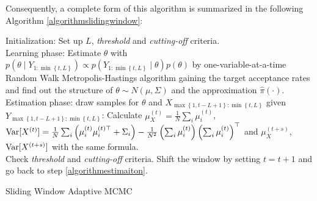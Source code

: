 Consequently, a complete form of this algorithm is summarized in the following Algorithm \ref{algorithmslidingwindow}: 
\begin{algorithm}[ht]
\SetAlgoLined 
Initialization: Set up $L$, \textit{threshold} and  \textit{cutting-off} criteria. \\
Learning phase: Estimate $\theta$ with $p\left(\theta\mid Y_{1:\min \left\lbrace t,L\right\rbrace } \right) \propto p\left(Y_{1:\min \left\lbrace t,L\right\rbrace } \mid \theta \right)p\left(\theta \right)$ by one-variable-at-a-time Random Walk Metropolis-Hastings algorithm gaining the target acceptance rates and find out the structure of $\theta\sim N\left(\mu,\Sigma\right)$ and the approximation $\hat{\pi}\left(\cdot\right)$. \label{algorithmlearningsurface}\\
Estimation phase: draw samples for $\theta$ and $X_{ \max\left\lbrace 1,t-L+1 \right\rbrace :\min \left\lbrace t,L\right\rbrace }$ given $Y_{ \max\left\lbrace 1,t-L+1 \right\rbrace :\min \left\lbrace t,L\right\rbrace }$: 
Calculate $\mu_X^{\left(t\right)} = \frac{1}{N} \sum_i \mu_i^{\left(t\right)}$, $\mathrm{Var}\lbrack X^{\left(t\right)}\rbrack = \frac{1}{N} \sum_i \left(\mu_i^{\left(t\right)} \mu_i^{\left(t\right)\top} +\Sigma_i\right) -\frac{1}{N^2} \left(\sum_i  \mu_i^{\left(t\right)}\right) \left(\sum_i \mu_i^{\left(t\right)}\right)^\top$ and $\mu_X^{\left(t+s\right)}$, $\mathrm{Var}\lbrack X^{\left(t+s\right)}\rbrack$ with the same formula.  \\
Check \textit{threshold} and  \textit{cutting-off} criteria. 
Shift the window by setting $t = t+1$ and go back to step \ref{algorithmestimaiton}.
 \caption{Sliding Window Adaptive MCMC}\label{algorithmslidingwindow}
\end{algorithm}


